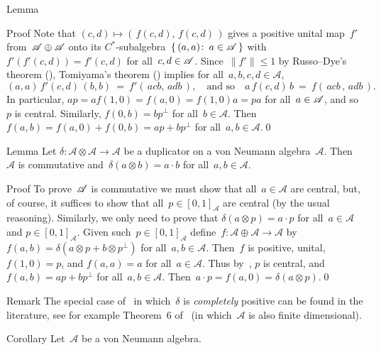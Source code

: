 \documentclass[a]{subfiles}
\begin{document}
\begin{parsec}
\begin{point}{Lemma}
\begin{point}{Proof}
Note that $(c,d)\mapsto (\,f(c,d),\,f(c,d)\,)$
gives a positive unital map~$f'$ from~$\mathscr{A}\oplus \mathscr{A}$
onto its $C^*$-subalgebra~$\{\,(a,a)\colon\,a\in\mathscr{A}\,\}$
with~$f'(f'(c,d))=f'(c,d)$ for all~$c,d\in\mathscr{A}$.
Since~$\|f'\|\leq 1$ by Russo--Dye's theorem (),
Tomiyama's theorem () 
implies 
for all~$a,b,c,d\in\mathscr{A}$,
\begin{equation*}
	(a,a)\,f'(c,d)\,(b,b)
	\ =\  f'(\,acb,\, adb\,),
	\quad\text{and so}\quad
a \,f(c,d)\, b \ = \ f(\,acb\,,\,adb\,).
\end{equation*}
In particular,
 $ap=af(1,0)=f(a,0)=f(1,0)a=pa$
 for all~$a\in\mathscr{A}$,
and so~$p$ is central.
Similarly, $f(0,b)=bp^\perp$
for all~$b\in\mathscr{A}$.
Then~$f(a,b)=f(a,0)+f(0,b)=ap+bp^\perp$
for all~$a,b\in\mathscr{A}$.\qed
\end{point}
\end{point}
\begin{point}{Lemma}%
Let $\delta\colon\mathscr{A}\otimes \mathscr{A}\to\mathscr{A}$
be a duplicator on a von Neumann algebra~$\mathscr{A}$.
Then~$\mathscr{A}$ is commutative and~$\delta(a\otimes b)=a\cdot b$
for all~$a,b\in\mathscr{A}$.
\begin{point}{Proof}%
To prove~$\mathscr{A}$ is commutative
we must show that all~$a\in\mathscr{A}$ are central,
but, of course,
it suffices
to show that all~$p\in [0,1]_\mathscr{A}$ are central
(by the usual reasoning).
Similarly, 
we only need to prove that $\delta(a\otimes p) = a\cdot p$
for all~$a\in\mathscr{A}$ and $p\in [0,1]_\mathscr{A}$.
Given such~$p\in[0,1]_\mathscr{A}$ 
define~$f\colon \mathscr{A}\oplus\mathscr{A}\to\mathscr{A}$
by $f(a,b) = \delta(a\otimes p+b\otimes p^\perp)$
for all~$a,b\in\mathscr{A}$.
Then~$f$ is positive, unital,
$f(1,0)=p$,
and 
$f(a,a)=a$
for all~$a\in \mathscr{A}$.
Thus by~,
$p$ is central,
and  $f(a,b)=ap+bp^\perp$ for all~$a,b\in\mathscr{A}$.
Then~$a\cdot p=f(a,0)=\delta(a \otimes p)$.\qed
\end{point}
\end{point}
\begin{point}{Remark}%
The special
case of~
in which~$\delta$ is \emph{completely} positive
can be found
in the literature,
see for example
Theorem~6 of~\cite{Maassen2010}
(in which~$\mathscr{A}$ is also finite dimensional).
\end{point}
\begin{point}{Corollary}
Let~$\mathscr{A}$
be a von Neumann algebra.

\end{point}
\end{parsec}
\end{document}
